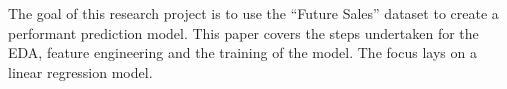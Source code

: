 
\begin{sciabstract}
The goal of this research project is to use the \enquote{Future Sales} dataset to create a performant prediction model. This paper covers the steps undertaken for the EDA, feature engineering and the training of the model. The focus lays on a linear regression model.
\end{sciabstract}

\clearpage
